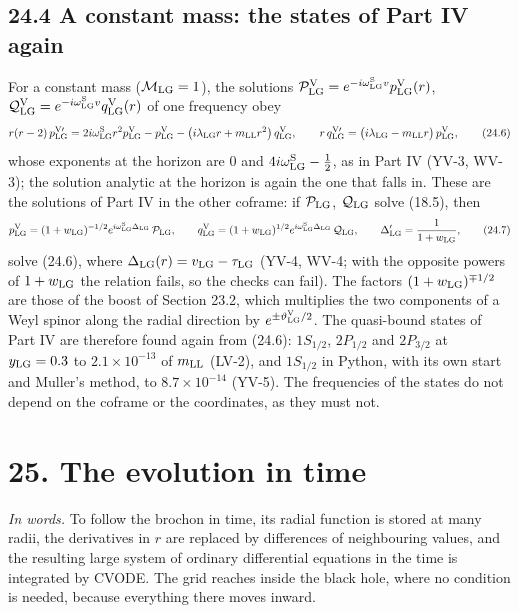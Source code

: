 \documentclass[
  10pt,
]{article}
\begin{document}
\hypertarget{a-constant-mass-the-states-of-part-iv-again}{%
\subsection{24.4 A constant mass: the states of Part IV
again}\label{a-constant-mass-the-states-of-part-iv-again}}

For a constant mass (\(\mathcal M_{\rm LG}=1\)), the solutions
\(\mathcal P^{\rm V}_{\rm LG}=e^{-i\omega^{\rm S}_{\rm LG}v}p^{\rm V}_{\rm LG}(r)\),
\(\mathcal Q^{\rm V}_{\rm LG}=e^{-i\omega^{\rm S}_{\rm LG}v}q^{\rm V}_{\rm LG}(r)\)
of one frequency obey
\[r(r-2)\,p^{\rm V\prime}_{\rm LG}=2i\omega^{\rm S}_{\rm LG}r^2p^{\rm V}_{\rm LG}-p^{\rm V}_{\rm LG}-\big(i\lambda_{\rm LG}r+m_{\rm LL}r^2\big)\,q^{\rm V}_{\rm LG},\qquad r\,q^{\rm V\prime}_{\rm LG}=\big(i\lambda_{\rm LG}-m_{\rm LL}r\big)\,p^{\rm V}_{\rm LG},\tag{24.6}\]
whose exponents at the horizon are \(0\) and
\(4i\omega^{\rm S}_{\rm LG}-\tfrac12\), as in Part IV (YV-3, WV-3); the
solution analytic at the horizon is again the one that falls in. These
are the solutions of Part IV in the other coframe: if
\(\mathcal P_{\rm LG}\), \(\mathcal Q_{\rm LG}\) solve (18.5), then
\[p^{\rm V}_{\rm LG}=(1+w_{\rm LG})^{-1/2}e^{i\omega^{\rm S}_{\rm LG}\Delta_{\rm LG}}\,\mathcal P_{\rm LG},\qquad q^{\rm V}_{\rm LG}=(1+w_{\rm LG})^{1/2}e^{i\omega^{\rm S}_{\rm LG}\Delta_{\rm LG}}\,\mathcal Q_{\rm LG},\qquad\Delta_{\rm LG}'=\frac1{1+w_{\rm LG}},\tag{24.7}\]
solve (24.6), where \(\Delta_{\rm LG}(r)=v_{\rm LG}-\tau_{\rm LG}\)
(YV-4, WV-4; with the opposite powers of \(1+w_{\rm LG}\) the relation
fails, so the checks can fail). The factors \((1+w_{\rm LG})^{\mp1/2}\)
are those of the boost of Section 23.2, which multiplies the two
components of a Weyl spinor along the radial direction by
\(e^{\pm\vartheta^{\rm V}_{\rm LG}/2}\). The quasi-bound states of Part
IV are therefore found again from (24.6): \(1S_{1/2}\), \(2P_{1/2}\) and
\(2P_{3/2}\) at \(y_{\rm LG}=0.3\) to \(2.1\times10^{-13}\) of
\(m_{\rm LL}\) (LV-2), and \(1S_{1/2}\) in Python, with its own start
and Muller's method, to \(8.7\times10^{-14}\) (YV-5). The frequencies of
the states do not depend on the coframe or the coordinates, as they must
not.

\hypertarget{the-evolution-in-time}{%
\section{25. The evolution in time}\label{the-evolution-in-time}}

\emph{In words.} To follow the brochon in time, its radial function is
stored at many radii, the derivatives in \(r\) are replaced by
differences of neighbouring values, and the resulting large system of
ordinary differential equations in the time is integrated by CVODE. The
grid reaches inside the black hole, where no condition is needed,
because everything there moves inward.
\end{document}
